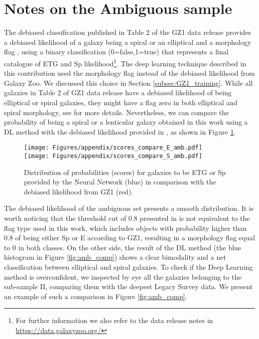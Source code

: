 \section{Notes on the Ambiguous sample}
\label{appendix}
The debiased classification published in Table 2 of the GZ1 data release provides a debiased likelihood of a galaxy being a spiral or an elliptical and a morphology flag \citet{lintott2011}, using a binary classification (0=false,1=true) that represents a final catalogue of ETG and Sp likelihood\footnote{For further information we also refer to the data release notes in \url{https://data.galaxyzoo.org/}}. The deep learning technique described in this contribution used the morphology flag instead of the debiased likelihood from Galaxy Zoo. We discussed this choice in Section \ref{subsec:GZ1_training}. While all galaxies in Table 2 of GZ1 data release have a debiased likelihood of being elliptical or spiral galaxies, they might have a flag zero in both elliptical and spiral morphology, see \citet{bamford2009galaxy,lintott2011} for more details.
Nevertheless, we can compare the probability of being a spiral or a lenticular galaxy obtained in this work using a DL method with the debiased likelihood provided in \citet{lintott2011}, as shown in Figure \ref{fig:amb_comp_prob}.

\begin{figure}
\centering
\texttt{[image: Figures/appendix/scores\_compare\_E\_amb.pdf]}\\
\texttt{[image: Figures/appendix/scores\_compare\_S\_amb.pdf]}
    \caption{
    \label{fig:amb_comp_prob}
    Distribution of probabilities (scores) for galaxies to be ETG or Sp provided by the Neural Network (blue) in comparison with the debiased likelihood from GZ1 (red).
    }
\end{figure}

The debiased likelihood of the ambiguous set presents a smooth distribution. It is worth noticing that the threshold cut of $0.8$ presented in \citep{bamford2009galaxy,lintott2011} is not equivalent to the flag type used in this work, which includes objects with probability higher than $0.8$ of being either Sp or E according to GZ1, resulting in a morphology flag equal to 0 in both classes. 
On the other side, the result of the DL method (the blue histogram in Figure \ref{fig:amb_comp}) shows a clear bimodality and a net classification between elliptical and spiral galaxies. To check if the Deep Learning method is overconfident, we inspected by eye all the galaxies belonging to the sub-sample II, comparing them with the deepest Legacy Survey \citep{dey2019overview,zou2017project} data. We present an example of such a comparison in Figure \ref{fig:amb_comp}.


